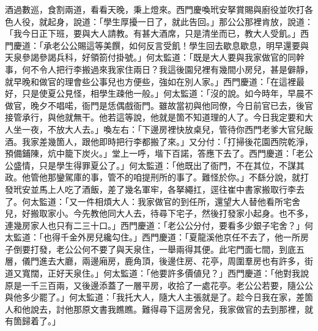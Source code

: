 酒過數巡，食割兩道，看看天晚，秉上燈來。西門慶喚玳安拏賞賜與廚役並吹打各色人役，就起身，說道：「學生厚擾一日了，就此告回。」那公公那裡肯放，說道：「我今日正下班，要與大人請教。有甚大酒席，只是清坐而已，教大人受飢。」西門慶道：「承老公公賜這等美饌，如何反言受飢！學生回去歇息歇息，明早還要與天泉參謁參謁兵科，好領箚付掛號。」何太監道：「既是大人要與我家做官的同幹事，何不令人把行李搬過來我家住兩日？我這後園兒裡有幾間小房兒，甚是僻靜，就早晚和做官的理會些公事兒也方便些，強如在別人家。」西門慶道：「在這裡最好，只是使夏公見怪，相學生疎他一般。」何太監道：「沒的說。如今時年，早晨不做官，晚夕不唱喏，衙門是恁偶戲衙門。{}雖故當初與他同僚，今日前官已去，後官接管承行，與他就無干。他若這等說，他就是箇不知道理的人了。{}今日我定要和大人坐一夜，不放大人去。」喚左右：「下邊房裡快放桌兒，管待你西門老爹大官兒飯酒。我家差幾箇人，跟他即時把行李都搬了來。」又分付：「打掃後花園西院乾淨，預備鋪陳，炕中籠下炭火。」堂上一呼，堦下百諾，答應下去了。西門慶道：「老公公盛情，只是學生得罪夏公了。」何太監道：「他既出了衙門，不在其位，不謀其政。他管他那鑾駕庫的事，{}管不的咱提刑所的事了。難怪於你。」不繇分說，就打發玳安並馬上人吃了酒飯，差了幾名軍牢，各拏繩扛，逕往崔中書家搬取行李去了。何太監道：「又一件相煩大人：我家做官的到任所，還望大人替他看所宅舍兒，好搬取家小。今先教他同大人去，待尋下宅子，然後打發家小起身。也不多，連幾房家人也只有二三十口。」西門慶道：「老公公分付，要看多少銀子宅舍？」何太監道：「也得千金外房兒纔勾住。」西門慶道：「夏龍溪他京任不去了，他一所房子倒要打發，老公公何不要了與天泉住，一舉兩得其便。此宅門面七間，到底五層，儀門進去大廳，兩邊廂房，鹿角頂，後邊住房、花亭，周圍羣房也有許多，街道又寬闊，正好天泉住。」何太監道：「他要許多價値兒？」西門慶道：「他對我說原是一千三百兩，又後邊添蓋了一層平房，收拾了一處花亭。老公公若要，隨公公與他多少罷了。」何太監道：「我托大人，隨大人主張就是了。趁今日我在家，差箇人和他說去，討他那原文書我瞧瞧。難得尋下這房舍兒，我家做官的去到那裡，就有箇歸着了。」

